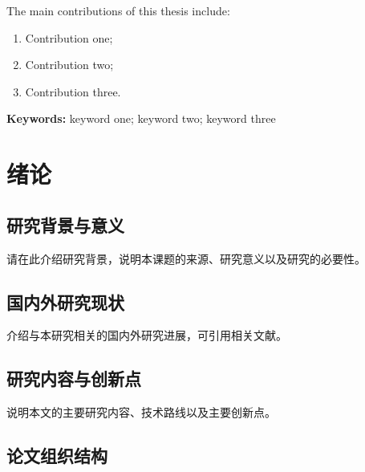 \documentclass[12pt,a4paper,openright,UTF8]{ctexbook}
\begin{document}
The main contributions of this thesis include:
\begin{enumerate}[label=(\arabic*)]
    \item Contribution one;
    \item Contribution two;
    \item Contribution three.
\end{enumerate}

\vspace{1cm}
\noindent\textbf{Keywords:} keyword one; keyword two; keyword three

\newpage
\tableofcontents

\newpage
\listoffigures
{}

\newpage
\listoftables
{}

\newpage
\cleardoublepage
\hypersetup{pageanchor=true}
\setcounter{page}{1}

\chapter{绪论}
\label{chap:intro}

\section{研究背景与意义}
\label{sec:background}

请在此介绍研究背景，说明本课题的来源、研究意义以及研究的必要性。

\section{国内外研究现状}
\label{sec:related}

介绍与本研究相关的国内外研究进展，可引用相关文献\cite{vaswani2017attention,he2016deep}。

\section{研究内容与创新点}
\label{sec:content}

说明本文的主要研究内容、技术路线以及主要创新点。

\section{论文组织结构}
\label{sec:structure}
\end{document}
